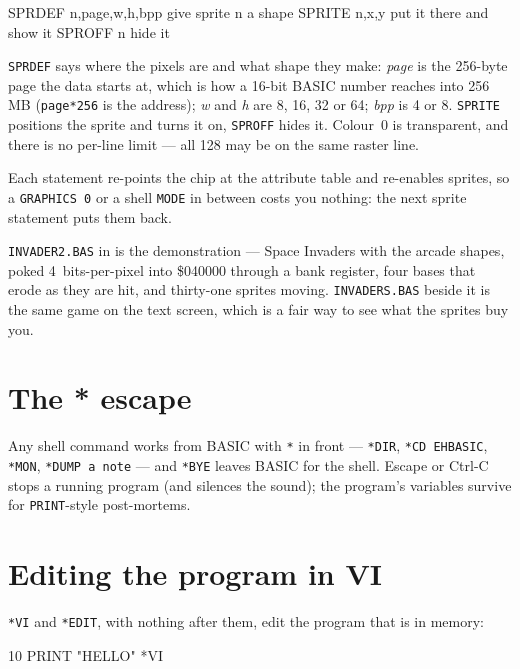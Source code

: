 \begin{type}
SPRDEF n,page,w,h,bpp   give sprite n a shape
SPRITE n,x,y            put it there and show it
SPROFF n                hide it
\end{type}

\verb|SPRDEF| says where the pixels are and what shape they make:
\emph{page} is the 256-byte page the data starts at, which is how a
16-bit BASIC number reaches into 256\,MB (\verb|page*256| is the
address); \emph{w} and \emph{h} are 8, 16, 32 or 64; \emph{bpp} is 4 or
8. \verb|SPRITE| positions the sprite and turns it on, \verb|SPROFF|
hides it. Colour~0 is transparent, and there is no per-line limit --- all
128 may be on the same raster line.

Each statement re-points the chip at the attribute table and re-enables
sprites, so a \verb|GRAPHICS 0| or a shell \verb|MODE| in between costs
you nothing: the next sprite statement puts them back.

\verb|INVADER2.BAS| in  is the demonstration --- Space
Invaders with the arcade shapes, poked 4~bits-per-pixel into \$040000
through a bank register, four bases that erode as they are hit, and
thirty-one sprites moving. \verb|INVADERS.BAS| beside it is the same
game on the text screen, which is a fair way to see what the sprites buy
you.


\section{The * escape}
Any shell command works from BASIC with \verb|*| in front --- \verb|*DIR|,
\verb|*CD EHBASIC|, \verb|*MON|, \verb|*DUMP a note| --- and \verb|*BYE|
leaves BASIC for the shell. Escape or Ctrl-C stops a running program (and
silences the sound); the program's variables survive for
\verb|PRINT|-style post-mortems.

\section{Editing the program in VI}\label{sec:basicvi}
\verb|*VI| and \verb|*EDIT|, with nothing after them, edit the program that
is in memory:

\begin{type}
10 PRINT "HELLO"
*VI
\end{type}

